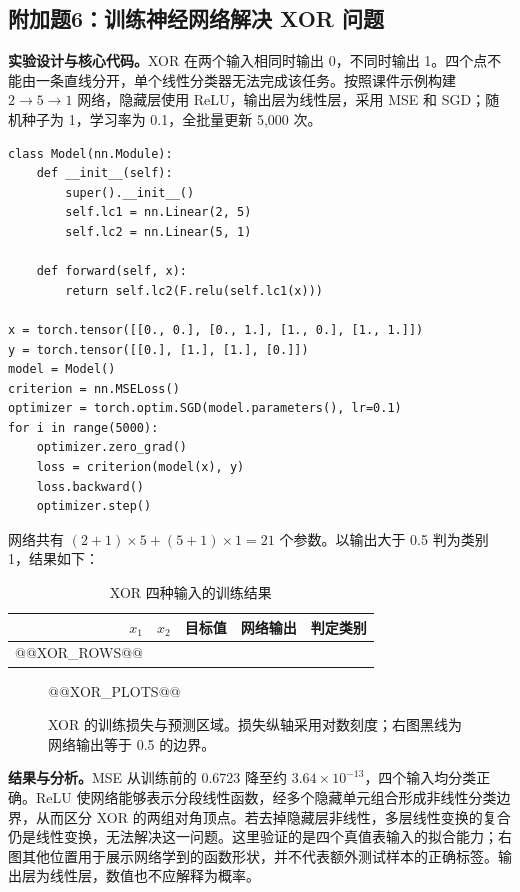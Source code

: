 \documentclass[UTF8,11pt,a4paper,fontset=fandol]{ctexart}
\newcommand{\question}[1]{\Needspace{14\baselineskip}\subsection{#1}}
\begin{document}
\clearpage
\question{附加题6：训练神经网络解决 XOR 问题}
\textbf{实验设计与核心代码。}XOR 在两个输入相同时输出 0，不同时输出 1。四个点不能由一条直线分开，单个线性分类器无法完成该任务。按照课件示例构建 $2\to5\to1$ 网络，隐藏层使用 ReLU，输出层为线性层，采用 MSE 和 SGD；随机种子为 1，学习率为 0.1，全批量更新 5,000 次。
\par\noindent\begin{minipage}{\linewidth}
\begin{lstlisting}
class Model(nn.Module):
    def __init__(self):
        super().__init__()
        self.lc1 = nn.Linear(2, 5)
        self.lc2 = nn.Linear(5, 1)

    def forward(self, x):
        return self.lc2(F.relu(self.lc1(x)))

x = torch.tensor([[0., 0.], [0., 1.], [1., 0.], [1., 1.]])
y = torch.tensor([[0.], [1.], [1.], [0.]])
model = Model()
criterion = nn.MSELoss()
optimizer = torch.optim.SGD(model.parameters(), lr=0.1)
for i in range(5000):
    optimizer.zero_grad()
    loss = criterion(model(x), y)
    loss.backward()
    optimizer.step()
\end{lstlisting}
\end{minipage}\par
网络共有 $(2+1)\times5+(5+1)\times1=21$ 个参数。以输出大于 0.5 判为类别 1，结果如下：
\begin{table}[H]\centering\small
\caption{XOR 四种输入的训练结果}
\begin{tabular}{rrrrr}\toprule
$x_1$ & $x_2$ & 目标值 & 网络输出 & 判定类别 \\\midrule
@@XOR_ROWS@@
\bottomrule\end{tabular}
\end{table}
\begin{figure}[H]\centering
@@XOR_PLOTS@@
\caption{XOR 的训练损失与预测区域。损失纵轴采用对数刻度；右图黑线为网络输出等于 0.5 的边界。}\label{fig:xor}
\end{figure}
\textbf{结果与分析。}MSE 从训练前的 0.6723 降至约 $3.64\times10^{-13}$，四个输入均分类正确。ReLU 使网络能够表示分段线性函数，经多个隐藏单元组合形成非线性分类边界，从而区分 XOR 的两组对角顶点。若去掉隐藏层非线性，多层线性变换的复合仍是线性变换，无法解决这一问题。这里验证的是四个真值表输入的拟合能力；右图其他位置用于展示网络学到的函数形状，并不代表额外测试样本的正确标签。输出层为线性层，数值也不应解释为概率。

\end{document}
